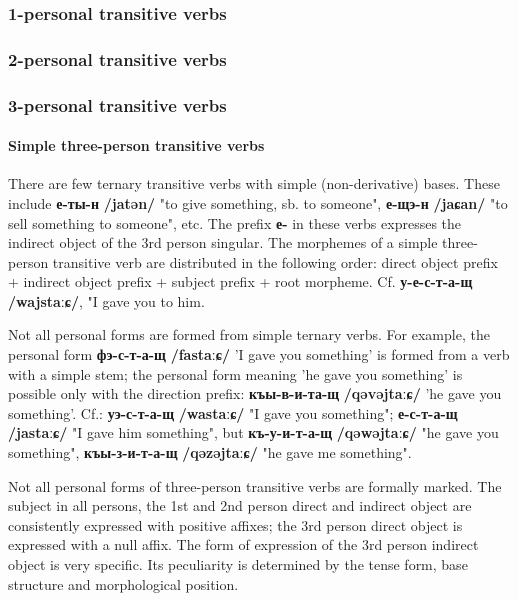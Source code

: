 \documentclass[a4paper,12pt]{book}
\newcommand{\1}[1]{\textbf{\emph{#1}}} %
\newcommand{\2}[1]{\textbf{[#1]}} %
\newcommand{\3}[1]{\fontsize{11pt}{0cm}\textbf{\emph{#1}}} %
\newcommand{\4}[1]{\fontsize{10pt}{0cm}\emph{#1}}	%
\newcommand{\5}[1]{\textbf{/#1/}} %
\newcommand{\6}[1]{\textbf{[#1]}} %
\newcommand{\7}[1]{\fontsize{12pt}{0cm}\emph{#1}} %
\newcommand{\8}[1]{\fontsize{12pt}{0cm}`#1'} %
\newcommand{\9}[1]{\fontsize{12pt}{0cm}(lit. `#1')} %
\newcommand{\glossphonemics}[1]{\textbf{/#1/}} %
\begin{document}
\subsubsection{1-personal transitive verbs}
\subsubsection{2-personal transitive verbs}
\subsubsection{3-personal transitive verbs}
\paragraph{Simple three-person transitive verbs}
There are few ternary transitive verbs with simple (non-derivative) bases. These include \textbf{е-ты-н} \glossphonemics{jatən} "to give something, sb. to someone", \textbf{е-щэ-н} \glossphonemics{jaɕan} "to sell something to someone", etc. The prefix \textbf{е-} in these verbs expresses the indirect object of the 3rd person singular. The morphemes of a simple three-person transitive verb are distributed in the following order: direct object prefix + indirect object prefix + subject prefix + root morpheme. Cf. \textbf{у-е-с-т-а-щ} \glossphonemics{wajstaːɕ}, "I gave you to him.

Not all personal forms are formed from simple ternary verbs. For example, the personal form \textbf{фэ-с-т-а-щ} \glossphonemics{fastaːɕ} 'I gave you something' is formed from a verb with a simple stem; the personal form meaning 'he gave you something' is possible only with the direction prefix: \textbf{къы-в-и-та-щ} \glossphonemics{qəvəjtaːɕ} 'he gave you something'. Cf.: \textbf{уэ-с-т-а-щ} \glossphonemics{wastaːɕ} "I gave you something"; \textbf{е-с-т-а-щ} \glossphonemics{jastaːɕ} "I gave him something", but \textbf{къ-у-и-т-а-щ} \glossphonemics{qəwəjtaːɕ} "he gave you something", \textbf{къы-з-и-т-а-щ} \glossphonemics{qəzəjtaːɕ} "he gave me something".

Not all personal forms of three-person transitive verbs are formally marked. The subject in all persons, the 1st and 2nd person direct and indirect object are consistently expressed with positive affixes; the 3rd person direct object is expressed with a null affix. The form of expression of the 3rd person indirect object is very specific. Its peculiarity is determined by the tense form, base structure and morphological position.
\end{document}
